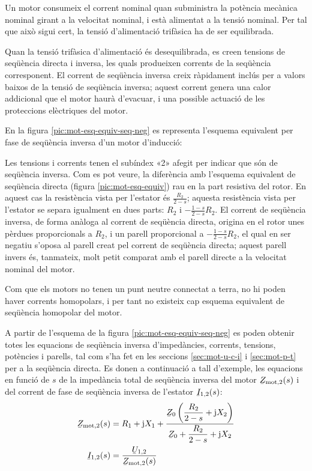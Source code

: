 Un motor consumeix el corrent nominal quan subministra la potència mecànica nominal girant a la velocitat nominal, i està alimentat a la tensió nominal. Per tal que això sigui cert, la tensió d'alimentació trifàsica ha de ser equilibrada.

Quan la tensió trifàsica d'alimentació és desequilibrada, es creen tensions de seqüència directa i inversa, les quals  produeixen corrents de la seqüència corresponent. El corrent de seqüència inversa creix ràpidament inclús per a valors baixos de  la tensió de seqüència inversa; aquest corrent genera una calor addicional que el motor haurà d'evacuar, i una possible actuació de les proteccions elèctriques del motor.

En la figura \vref{pic:mot-esq-equiv-seq-neg} es representa l'esquema equivalent per fase de seqüència inversa d'un   motor d'inducció:

\begin{center}
	
	\label{pic:mot-esq-equiv-seq-neg}
\end{center}

Les tensions i corrents tenen el subíndex «2» afegit per indicar que són de seqüència inversa. Com es pot veure, la diferència amb l'esquema equivalent de seqüència directa (figura \vref{pic:mot-esq-equiv}) rau en la part resistiva del rotor. En aquest cas la resistència vista per l'estator és $\frac{R_2}{2-s}$; aquesta resistència vista per l'estator se separa igualment en dues parts: $R_2$ i $-\frac{1-s}{2-s} R_2$. El corrent de seqüència inversa, de forma anàloga al corrent de seqüència directa,  origina en el rotor unes pèrdues proporcionals a $R_2$, i un parell proporcional a $-\frac{1-s}{2-s} R_2$, el qual en ser negatiu s'oposa al parell creat pel corrent de seqüència directa; aquest parell invers és, tanmateix, molt petit comparat amb el parell directe a la velocitat nominal del motor.

Com que els motors no tenen un punt neutre connectat a terra, no hi poden haver corrents homopolars, i per tant no existeix cap esquema equivalent de seqüència homopolar del motor.

A partir de l'esquema de la figura \vref{pic:mot-esq-equiv-seq-neg} es poden obtenir totes les equacions de seqüència inversa d'impedàncies, corrents, tensions, potències i parells, tal com s'ha fet en les seccions \ref{sec:mot-u-c-i} i \ref{sec:mot-p-t} per a la seqüència directa. Es donen a continuació a tall d'exemple, les equacions en funció de $s$ de la impedància total de seqüència inversa del motor $\cmplx{Z}\ped{mot,2}(s)$ i del corrent de fase de seqüència inversa de l'estator $\cmplx{I}_{1,2}(s)$:
\begin{align}
	\cmplx{Z}\ped{mot,2}(s) &= R_1 + \ju X_1 + \frac{\cmplx{Z}_0 \left( \dfrac{R_2}{2-s} + \ju X_2\right)}{\cmplx{Z}_0 +  \dfrac{R_2}{2-s} + \ju X_2}\label{eq:mot-Zmot-inv}\\
	\cmplx{I}_{1,2}(s) &= \frac{\cmplx{U}_{1,2}}{\cmplx{Z}\ped{mot,2}(s)}\label{eq:mot-I1-inv}
\end{align}

